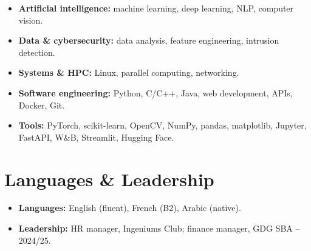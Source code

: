 \documentclass[10pt,a4paper]{article}
\begin{document}
\begin{itemize}
    \item \textbf{Artificial intelligence:} machine learning, deep learning, NLP, computer vision.
    \item \textbf{Data \& cybersecurity:} data analysis, feature engineering, intrusion detection.
    \item \textbf{Systems \& HPC:} Linux, parallel computing, networking.
    \item \textbf{Software engineering:} Python, C/C++, Java, web development, APIs, Docker, Git.
    \item \textbf{Tools:} PyTorch, scikit-learn, OpenCV, NumPy, pandas, matplotlib, Jupyter, FastAPI, W\&B, Streamlit, Hugging Face.
\end{itemize}

\section{Languages \& Leadership}

\begin{itemize}
    \item \textbf{Languages:} English (fluent), French (B2), Arabic (native).
    \item \textbf{Leadership:} HR manager, Ingeniums Club; finance manager, GDG SBA -- 2024/25.
\end{itemize}
\end{document}
